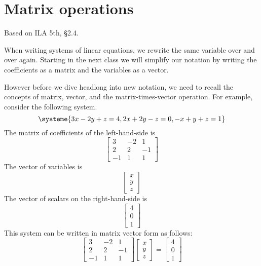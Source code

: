 \documentclass[11pt,oneside]{amsbook}
\theoremstyle{definition}
\theoremstyle{plain}
\theoremstyle{definition}
\theoremstyle{remark}
\numberwithin{equation}{section}
\numberwithin{figure}{section}
\begin{document}
\newpage
\section{Matrix operations}

Based on ILA 5th, \S 2.4.

When writing systems of linear equations, we rewrite the same variable over and over again. Starting in the next class we will simplify our notation by writing the coefficients as a matrix and the variables as a vector.

However before we dive headlong into new notation, we need to recall the concepts of matrix, vector, and the matrix-times-vector operation. For example, consider the following system.
\[\systeme{3x-2y+z=4,2x+2y-z=0,-x+y+z=1}
\]
The matrix of coefficients of the left-hand-side is
\[\begin{bmatrix}3&-2&1\\2&2&-1\\-1&1&1\end{bmatrix}
\]
The vector of variables is
\[\begin{bmatrix}x\\y\\z\end{bmatrix}
\]
The vector of scalars on the right-hand-side is
\[\begin{bmatrix}4\\0\\1\end{bmatrix}
\]
This system can be written in matrix vector form as follows:
\[\begin{bmatrix}3&-2&1\\2&2&-1\\-1&1&1\end{bmatrix}
  \begin{bmatrix}x\\y\\z\end{bmatrix}
  =\begin{bmatrix}4\\0\\1\end{bmatrix}
\]
\end{document}
